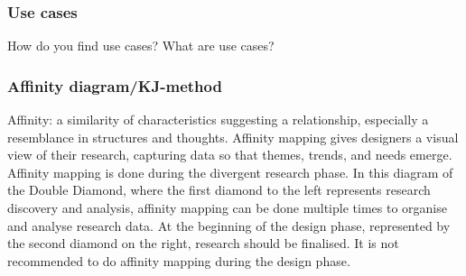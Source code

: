\subsubsection{Use cases}
How do you find use cases? What are use cases?

\subsubsection{Affinity diagram/KJ-method}
Affinity: a similarity of characteristics suggesting a relationship, especially a resemblance in structures and thoughts.
Affinity mapping gives designers a visual view of their research, capturing data so that themes, trends, and needs emerge.
Affinity mapping is done during the divergent research phase. In this diagram of the Double Diamond, where the first diamond to the left represents research discovery and analysis, affinity mapping can be done multiple times to organise and analyse research data. At the beginning of the design phase, represented by the second diamond on the right, research should be finalised. It is not recommended to do affinity mapping during the design phase.